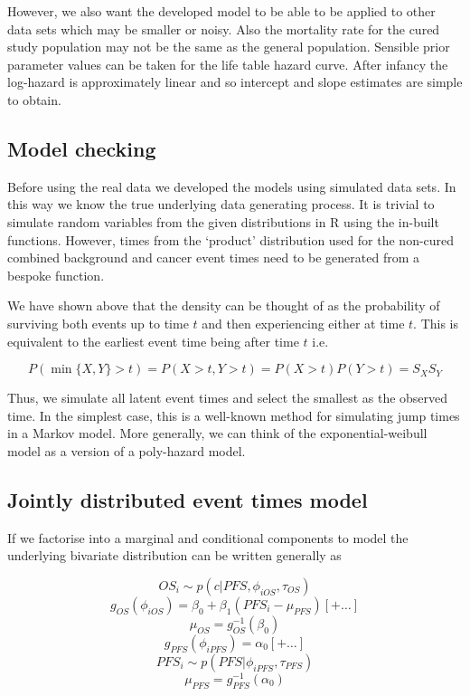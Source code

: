 \documentclass[
]{article}
\begin{document}
However, we also want the developed model to be able to be applied to
other data sets which may be smaller or noisy. Also the mortality rate
for the cured study population may not be the same as the general
population. Sensible prior parameter values can be taken for the life
table hazard curve. After infancy the log-hazard is approximately linear
and so intercept and slope estimates are simple to obtain.

\hypertarget{model-checking}{%
\subsection{Model checking}\label{model-checking}}

Before using the real data we developed the models using simulated data
sets. In this way we know the true underlying data generating process.
It is trivial to simulate random variables from the given distributions
in R using the in-built functions. However, times from the `product'
distribution used for the non-cured combined background and cancer event
times need to be generated from a bespoke function.

We have shown above that the density can be thought of as the
probability of surviving both events up to time \(t\) and then
experiencing either at time \(t\). This is equivalent to the earliest
event time being after time \(t\) i.e.

\[
P(\min\{ X,Y \}>t) = P(X>t, Y>t) = P(X>t) P(Y>t) = S_X S_Y
\]

Thus, we simulate all latent event times and select the smallest as the
observed time. In the simplest case, this is a well-known method for
simulating jump times in a Markov model. More generally, we can think of
the exponential-weibull model as a version of a poly-hazard model.

\hypertarget{jointly-distributed-event-times-model}{%
\subsection{Jointly distributed event times
model}\label{jointly-distributed-event-times-model}}

If we factorise into a marginal and conditional components to model the
underlying bivariate distribution can be written generally as

\[
OS_i \sim p(c | PFS, \phi_{iOS}, \tau_{OS})
\] \[
g_{OS}(\phi_{iOS}) = \beta_0 + \beta_1 (PFS_i - \mu_{PFS})[+ \ldots]
\] \[
\mu_{OS} = g_{OS}^{-1}(\beta_0)
\] \[
g_{PFS}(\phi_{iPFS}) = \alpha_0 [+ \ldots]
\] \[
PFS_i \sim p(PFS | \phi_{iPFS}, \tau_{PFS})
\] \[
\mu_{PFS} = g_{PFS}^{-1}(\alpha_0)
\]
\end{document}
